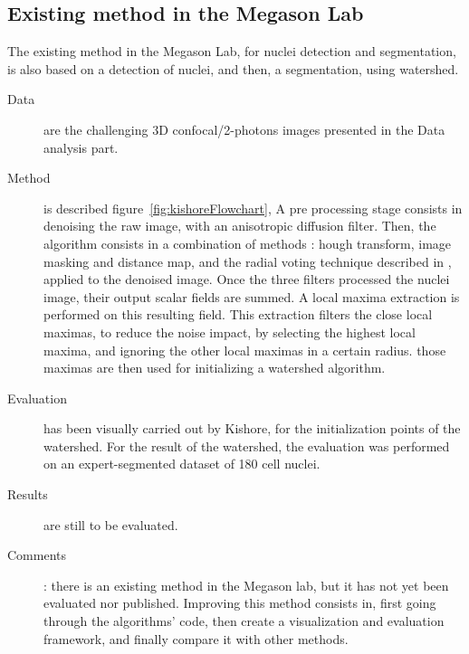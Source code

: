 \subsection*{Existing method in the Megason Lab}
\label{sect:megasonExisting}
The existing method in the Megason Lab, for nuclei detection and segmentation, is also based on a detection of nuclei, and then, a segmentation, using watershed.
  \begin{description}
  \item[Data] are the challenging 3D confocal/2-photons images presented in the Data analysis part. 
  \item[Method] is described figure~\ref{fig:kishoreFlowchart},
  A pre processing stage consists in denoising the raw image, with an anisotropic diffusion filter.
  Then, the algorithm consists in a combination of methods : 
  hough transform, image masking and distance map, and the radial voting technique described in \cite{chang2007segmentation}, applied to the denoised image.
  Once the three filters processed the nuclei image, their output scalar fields are summed.
  A local maxima extraction is performed on this resulting field.
  This extraction filters the close local maximas, to reduce the noise impact, by selecting the highest local maxima, and ignoring the other local maximas in a certain radius.
  those maximas are then used for initializing a watershed algorithm.
  \item[Evaluation] has been visually carried out by Kishore, for the initialization points of the watershed.
  For the result of the watershed, the evaluation was performed on an expert-segmented dataset of 180 cell nuclei.
  \item[Results] are still to be evaluated.
  \item[Comments]: there is an existing method in the Megason lab, but it has not yet been evaluated nor published. Improving this method consists in, first going through the algorithms' code, then create a visualization and evaluation framework, and finally compare it with other methods.
\end{description}
